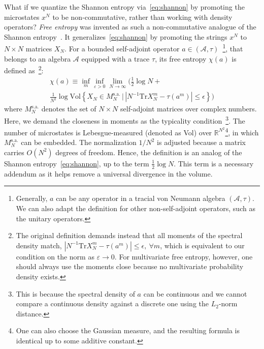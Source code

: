 \documentclass[aps,pre,twocolumn,superscriptaddress,amsmath,amssymb,reprint]{revtex4-2}
\def\eps{\varepsilon}
\newcommand*{\Tr}{\mathrm{Tr}}
\def\A{\mathcal{A}}
\begin{document}
What if we quantize the Shannon entropy via~\eqref{eq:shannon} by promoting the microstates $x^N$ to be non-commutative, rather than working with density operators? \emph{Free entropy} was invented as such a non-commutative analogue of the Shannon entropy~\cite{voiculescu1993analogues,voiculescu1994analogues,voiculescu1996analogues,voiculescu1998analogues,voiculescu1999analogues,voiculescu2002free}. It generalizes~\eqref{eq:shannon} by promoting the strings $x^N$ to $N\times N$ matrices $X_N$. For a bounded self-adjoint operator $a\in(\A,\tau)$~\footnote{Generally, $a$ can be any operator in a tracial von Neumann algebra $(\A,\tau)$. We can also adapt the definition for other non-self-adjoint operators, such as the unitary operators.}, that belongs to an algebra $\A$ equipped with a trace $\tau$, its free entropy $\chi(a)$ is defined as~\footnote{The original definition demands instead that all moments of the spectral density match, $|N^{-1}\Tr X_N^m-\tau(a^m)|\le\epsilon,\ \forall m$, which is equivalent to our condition on the norm as $\eps\to0$. For multivariate free entropy, however, one should always use the moments close because no multivariate probability density exists.}:
\begin{multline}\label{eq:free_ent}
    \chi(a)\equiv \inf_m\inf_{\eps>0}\lim_{N\to\infty}\bigg ( \frac12\log N +\\
    \frac{1}{N^2}\log \mathrm{Vol}\left\{ X_N\in M^{\mathrm{s.a.}}_N\, \bigg\vert\, |N^{-1}\Tr X_N^m-\tau(a^m)|\le\epsilon \right\}\bigg )
\end{multline} 
where $M^{\mathrm{s.a.}}_N$ denotes the set of $N\times N$ self-adjoint matrices over complex numbers. Here, we demand the closeness in moments as the typicality condition~\footnote{This is because the spectral density of $a$ can be continuous and we cannot compare a continuous density against a discrete one using the $L_2$-norm distance.}. The number of microstates is Lebesgue-measured (denoted as Vol) over $\mathbb{R}^{N^2}$\footnote{One can also choose the Gaussian measure, and the resulting formula is identical up to some additive constant.}, in which $M^{\mathrm{s.a.}}_N$ can be embedded. The normalization $1/N^2$ is adjusted because a matrix carries $O(N^2)$ degrees of freedom. Hence, the definition is an analog of the Shannon entropy~\eqref{eq:shannon}, up to the term $\frac12\log N$. This term is a necessary addendum as it helps remove a universal divergence in the volume.
\end{document}
